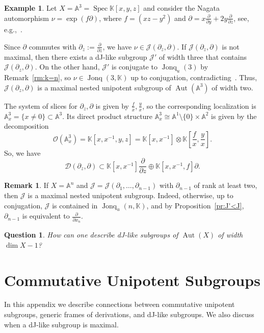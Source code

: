 \documentclass[12pt,a4paper]{amsart}
\theoremstyle{plain}
\newtheorem{question}[theorem]{Question}
\theoremstyle{definition}
\newtheorem{example}[theorem]{Example}
\newtheorem{remark}[theorem]{Remark}
\theoremstyle{remark}
\def\Aut{\operatorname{Aut}}
\def\Spec{\operatorname{Spec}}
\def\AA{{\mathbb A}}
\def\K{{\mathbb K}}
\def\cO{{\mathcal O}}
\def\J{{\mathcal J}}
\DeclareMathOperator{\Jonq}{Jonq}
\begin{document}
\begin{example} 
   Let $X=\AA^3=\Spec\K[x,y,z]$ and consider the Nagata automorphism $\nu=\exp(f\partial)$, where $f=(xz-y^2)$ and $\partial=x \frac{\partial}{\partial y} + 2y \frac{\partial}{\partial z}$, see, e.g.,~\cite[Section 3.8.1]{Freudenburg}. 
   
   Since $\partial$ commutes with $\partial_z:=\frac{\partial}{\partial z}$, we have $\nu\in\J(\partial_z,\partial)$.
   If $\J(\partial_z,\partial)$ is not maximal, then
   there exists a dJ-like subgroup $\J'$ of width three that contains $\J(\partial_z,\partial)$. 
   On the other hand, $\J'$ is conjugate to $\Jonq_u(3)$ by Remark~\ref{rm:k=n}, so $\nu\in\Jonq(3,\K)$ up to conjugation, contradicting~\cite{Bass}.
      Thus, $\J(\partial_z,\partial)$ is a maximal nested unipotent subgroup of $\Aut(\AA^3)$ of width two. %

   The system of slices for $\partial_z, \partial$ is given by $\frac{f}{x},\frac{y}{x}$, so the corresponding localization is $\AA^3_x=\{x\neq0\}\subset \AA^3$. 
   Its direct product structure $\AA^3_x\cong \AA^1\setminus\{0\}\times\AA^2$ is given by the decomposition
   \[
      \cO(\AA^3_x)=\K[x,x^{-1},y,z]=\K[x,x^{-1}]\otimes\K\left[\frac{f}{x},\frac{y}{x}\right].
   \]
   So, we have
   \[
    \mathcal{D}(\partial_z,\partial)\subset
    \K[x,x^{-1}]\frac{\partial}{\partial z}
    \oplus
    \K[x,x^{-1},f]\partial.
   \]
\end{example}
   


\begin{remark}
   If $X=\AA^n$ and $\J=\J(\partial_1,\ldots,\partial_{n-1})$ with $\partial_{n-1}$ of rank at least two, then $\J$ is a maximal nested unipotent subgroup. Indeed, otherwise, up to conjugation, $\J$ is contained in $\Jonq_u(n,\K)$, and by Proposition~\ref{pr:J'<J}, $\partial_{n-1}$ is equivalent to $\frac{\partial}{\partial x_n}$.
\end{remark}

\begin{question}
   How can one describe dJ-like subgroups of $\Aut(X)$ of width $\dim X-1$?
\end{question}



\appendix

\section{Commutative Unipotent Subgroups}\label{sec:max-commut}
 In this appendix we describe connections between commutative unipotent subgroups, generic frames of derivations, and dJ-like subgroups.
We also discuss when a dJ-like subgroup is maximal.
\end{document}
